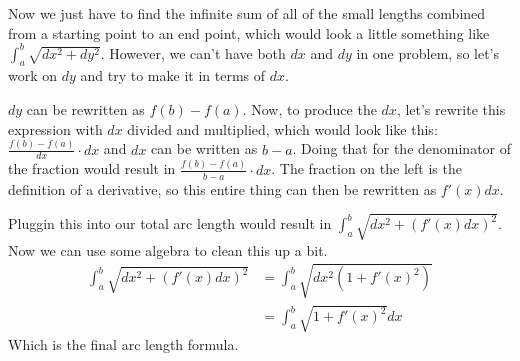 \documentclass[letterpaper, 12pt]{article}
\begin{document}
\begin{center}
\end{center}
Now we just have to find the infinite sum of all of the small lengths combined from a starting point to an end point, which would look a little something like $\int_{a}^{b}\sqrt{dx^{2}+dy^{2}}$. However, we can't have both $dx$ and $dy$ in one problem, so let's work on $dy$ and try to make it in terms of $dx$. \par
$dy$ can be rewritten as $f(b)-f(a)$. Now, to produce the $dx$, let's rewrite this expression with $dx$ divided and multiplied, which would look like this: $\frac{f\left(b\right)-f\left(a\right)}{dx}\cdot dx$ and $dx$ can be written as $b-a$. Doing that for the denominator of the fraction would result in $\frac{f\left(b\right)-f\left(a\right)}{b-a}\cdot dx$. The fraction on the left is the definition of a derivative, so this entire thing can then be rewritten as $f'\left(x\right)dx$. \par
Pluggin this into our total arc length would result in $\int_{a}^{b}\sqrt{dx^{2}+\left(f'\left(x\right)dx\right)^{2}}$. Now we can use some algebra to clean this up a bit.
\begin{align}
    \int_{a}^{b}\sqrt{dx^{2}+\left(f'\left(x\right)dx\right)^{2}} & =\int_{a}^{b}\sqrt{dx^{2}\left(1+f'\left(x\right)^{2}\right)} \\
                                                                  & =\boxed{\int_{a}^{b}\sqrt{1+f'\left(x\right)^{2}}dx}
\end{align}
Which is the final arc length formula.
\end{document}
